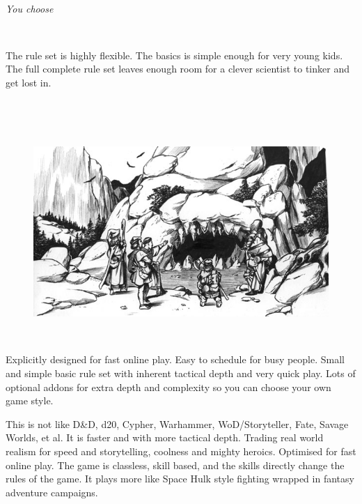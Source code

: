 \

\emph{You choose}

\

\noindent
The rule set is highly flexible. The basics is simple enough for very young kids. The full complete rule set leaves enough room for a clever scientist to tinker and get lost in.



\

\

\begin{figure}[h]
\centering
\includegraphics[width=120mm]{./fig/cavemouth.jpg}
\end{figure}


\

\noindent
Explicitly designed for fast online play. Easy to schedule for busy people. Small and simple basic rule set with inherent tactical depth and very quick play. Lots of optional addons for extra depth and complexity so you can choose your own game style.

This is not like D\&D, d20, Cypher, Warhammer, WoD/Storyteller, Fate, Savage Worlds, et al. It is faster and with more tactical depth. Trading real world realism for speed and storytelling, coolness and mighty heroics. Optimised for fast online play. The game is classless, skill based, and the skills directly change the rules of the game. It plays more like Space Hulk style fighting wrapped in fantasy adventure campaigns.





\clearpage %



